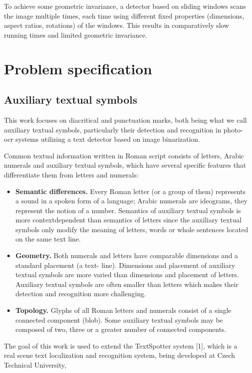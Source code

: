\documentclass[12pt,a4paper]{report}
\begin{document}
To achieve some geometric invariance, a detector based on sliding windows scans the image multiple times, each time using different fixed properties (dimensions, aspect ratios, rotations) of the windows. This results in comparatively slow running times and limited geometric invariance.

\chapter{Problem specification}
\section{Auxiliary textual symbols}
This work focuses on diacritical and punctuation marks, both being what we call auxiliary textual symbols, particularly their detection and recognition in photo- ocr systems utilizing a text detector based on image binarization.

Common textual information written in Roman script consists of letters, Arabic numerals and auxiliary textual symbols, which have several specific features that differentiate them from letters and numerals:

\begin{itemize}
    \item \textbf{Semantic differences.} Every Roman letter (or a group of them) represents a sound in a spoken form of a language; Arabic numerals are ideograms, they represent the notion of a number. Semantics of auxiliary textual symbols is more contextdependent than semantics of letters since the auxiliary textual symbols only modify the meaning of letters, words or whole sentences located on the same text line.
    \item \textbf{Geometry.} Both numerals and letters have comparable dimensions and a standard placement (a text- line). Dimensions and placement of auxiliary textual symbols are more varied than dimensions and placement of letters. Auxiliary textual symbols are often smaller than letters which makes their detection and recognition more challenging.
    \item \textbf{Topology.} Glyphs of all Roman letters and numerals consist of a single connected component (blob). Some auxiliary textual symbols may be composed of two, three or a greater number of connected components.
\end{itemize}

The goal of this work is used to extend the TextSpotter system [1], which is a real scene text localization and recognition system, being developed at Czech Technical University,
\end{document}
